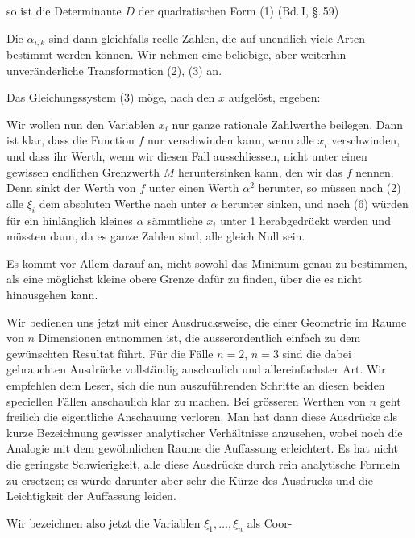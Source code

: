 so ist die Determinante $D$ der quadratischen Form (1) (Bd.\,I, \S.\,59)

Die $\alpha_{i,k}$ sind dann gleichfalls reelle Zahlen, die auf unendlich viele Arten bestimmt werden k\"onnen. Wir nehmen eine beliebige, aber weiterhin unver\"anderliche Transformation (2), (3) an.

Das Gleichungssystem (3) m\"oge, nach den $x$ aufgel\"ost, ergeben:

Wir wollen nun den Variablen $x_i$ nur ganze rationale Zahlwerthe beilegen. Dann ist klar, dass die Function $f$ nur verschwinden kann, wenn alle $x_i$ verschwinden, und dass ihr Werth, wenn wir diesen Fall ausschliessen, nicht unter einen gewissen endlichen Grenzwerth $M$ heruntersinken kann, den wir das  $f$ nennen. Denn sinkt der Werth von $f$ unter einen Werth $\alpha^2$ herunter, so m\"ussen nach (2) alle $\xi_i$ dem absoluten Werthe nach unter $\alpha$ herunter sinken, und nach (6) w\"urden f\"ur ein hinl\"anglich kleines $\alpha$ s\"ammtliche $x_i$ unter 1 herabgedr\"uckt werden und m\"ussten dann, da es ganze Zahlen sind, alle gleich Null sein.

Es kommt vor Allem darauf an, nicht sowohl das Minimum genau zu bestimmen, als eine m\"oglichst kleine obere Grenze daf\"ur zu finden, \"uber die es nicht hinausgehen kann.

Wir bedienen uns jetzt mit  einer Ausdrucksweise, die einer Geometrie im Raume von $n$ Dimensionen entnommen ist, die ausserordentlich einfach zu dem gew\"unschten Resultat f\"uhrt. F\"ur die F\"alle $n=2$, $n=3$ sind die dabei gebrauchten Ausdr\"ucke vollst\"andig anschaulich und allereinfachster Art. Wir empfehlen dem Leser, sich die nun auszuf\"uhrenden Schritte an diesen beiden speciellen F\"allen anschaulich klar zu machen. Bei gr\"osseren Werthen von $n$ geht freilich die eigentliche Anschauung verloren. Man hat dann diese Ausdr\"ucke als kurze Bezeichnung gewisser analytischer Verh\"altnisse anzusehen, wobei noch die Analogie mit dem gew\"ohnlichen Raume die Auffassung erleichtert. Es hat nicht die geringste Schwierigkeit, alle diese Ausdr\"ucke durch rein analytische Formeln zu ersetzen; es w\"urde darunter aber sehr die K\"urze des Ausdrucks und die Leichtigkeit der Auffassung leiden.

Wir bezeichnen also jetzt die Variablen $\xi_1, \ldots, \xi_n$ als Coor-
